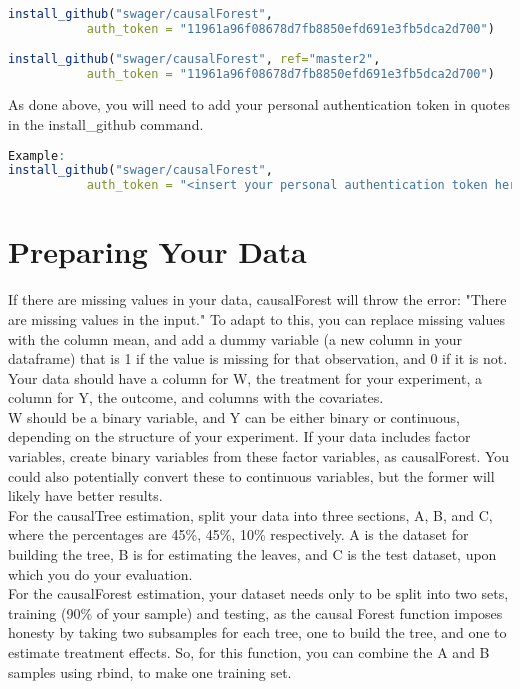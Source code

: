 \documentclass{article}
\begin{document}
\begin{lstlisting}[language=R]
install_github("swager/causalForest", 
           auth_token = "11961a96f08678d7fb8850efd691e3fb5dca2d700") 
    
install_github("swager/causalForest", ref="master2", 
           auth_token = "11961a96f08678d7fb8850efd691e3fb5dca2d700")
\end{lstlisting}


As done above, you will need to add your personal authentication token in quotes in the install\_github command.

\begin{lstlisting}[language=R]
Example:
install_github("swager/causalForest", 
           auth_token = "<insert your personal authentication token here>") 
\end{lstlisting}




\section{Preparing Your Data}

If there are missing values in your data, causalForest will throw the error: "There are missing values in the input."
To adapt to this, you can replace missing values with the column mean, and add a dummy variable (a new column in your dataframe) that is 1 if the value is missing for that observation, and 0 if it is not.  \\

Your data should have a column for W, the treatment for your experiment, a column for Y, the outcome, and columns with the covariates. \\
W should be a binary variable, and Y can be either binary or continuous, depending on the structure of your experiment.
If your data includes factor variables, create binary variables from these factor variables, as causalForest. You could also potentially convert these to continuous variables, but the former will likely have better results.\\

For the causalTree estimation, split your data into three sections, A, B, and C, where the percentages are 45\%, 45\%, 10\% respectively. A is the dataset for building the tree, B is for estimating the leaves, and C is the test dataset, upon which you do your evaluation. \\

For the causalForest estimation, your dataset needs only to be split into two sets, training (90\% of your sample) and testing, as the causal Forest function imposes honesty by taking two subsamples for each tree, one to build the tree, and one to estimate treatment effects. So, for this function, you can combine the A and B samples using rbind, to make one training set.  \\
\end{document}

